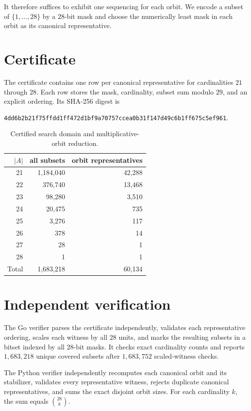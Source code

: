 \documentclass[11pt]{article}
\begin{document}
It therefore suffices to exhibit one sequencing for each orbit. We encode a subset of $\{1,\dots,28\}$ by a $28$-bit mask and choose the numerically least mask in each orbit as its canonical representative.

\section{Certificate}
The certificate contains one row per canonical representative for cardinalities $21$ through $28$. Each row stores the mask, cardinality, subset sum modulo $29$, and an explicit ordering. Its SHA-256 digest is
\begin{center}
\texttt{4dd6b2b21f75ffdd1ff472d1bf9a70757ccea0b31f147d49c6b1ff675c5ef961}.
\end{center}

\begin{table}[h]
\centering
\begin{tabular}{rrr}
\toprule
$|A|$ & all subsets & orbit representatives\\
\midrule
21 & 1,184,040 & 42,288\\
22 & 376,740 & 13,468\\
23 & 98,280 & 3,510\\
24 & 20,475 & 735\\
25 & 3,276 & 117\\
26 & 378 & 14\\
27 & 28 & 1\\
28 & 1 & 1\\
\midrule
Total & 1,683,218 & 60,134\\
\bottomrule
\end{tabular}
\caption{Certified search domain and multiplicative-orbit reduction.}
\end{table}

\section{Independent verification}
The Go verifier parses the certificate independently, validates each representative ordering, scales each witness by all $28$ units, and marks the resulting subsets in a bitset indexed by all $28$-bit masks. It checks exact cardinality counts and reports $1{,}683{,}218$ unique covered subsets after $1{,}683{,}752$ scaled-witness checks.

The Python verifier independently recomputes each canonical orbit and its stabilizer, validates every representative witness, rejects duplicate canonical representatives, and sums the exact disjoint orbit sizes. For each cardinality $k$, the sum equals $\binom{28}{k}$.
\end{document}
